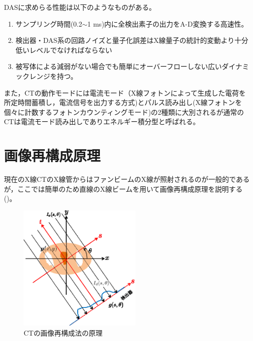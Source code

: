 DASに求めらる性能は以下のようなものがある。
\begin{enumerate}
\item サンプリング時間(0.2$\sim$1 ms)内に全検出素子の出力をA-D変換する高速性。
\item 検出器・DAS系の回路ノイズと量子化誤差はX線量子の統計的変動より十分低いレベルでなければならない
\item 被写体による減弱がない場合でも簡単にオーバーフローしない広いダイナミックレンジを持つ。
\end{enumerate}



また，CTの動作モードには電流モード（X線フォトンによって生成した電荷を所定時間蓄積し，電流信号を出力する方式)とパルス読み出し(X線フォトンを個々に計数するフォトンカウンティングモード)の2種類に大別されるが通常のCTは電流モード読み出しでありエネルギー積分型と呼ばれる。





\section{画像再構成原理}
現在のX線CTのX線管からはファンビームのX線が照射されるのが一般的であるが，ここでは簡単のため直線のX線ビームを用いて画像再構成原理を説明する()。

\begin{figure}
 \begin{center}
 \includegraphics[width=6cm]{image/other/FBP.eps}
 \end{center}
 \caption{CTの画像再構成法の原理}
 \label{fig:FBP}
\end{figure}

